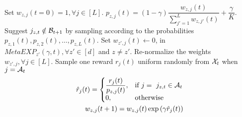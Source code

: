 \begin{algorithm}[!th]
\caption{$MetaEXP_{z}(\gamma, t)$}
\label{alg:mEXP3}
\begin{algorithmic}[1]
 Set $w_{z,j}(t=0) = 1, \forall j\in [L]$.
{}
\State $p_{z,j}(t) = \left( 1 - \gamma \right)\dfrac{w_{z,j}(t)}{\sum_{j'=1}^{L}w_{z,j'}(t)} + \dfrac{\gamma}{K}$.
\EndFor
\State Suggest $j_{z,t} \notin \mathcal{B}_{t+1}$ by sampling according to the probabilities $p_{z,1}(t), p_{z,2}(t), \ldots, p_{z,L}(t)$.
\State Set $w_{z',j}(t) \leftarrow 0$, in $MetaEXP_{z'}(\gamma, t),  \forall z' \in[d]$ and $z\neq z'$. Re-normalize the weights $w_{z',j},\forall j\in [L]$.
{}
\State Sample one reward $r_j(t)$ uniform randomly from $\mathcal{X}_t$ when $j = \mathcal{A}_t$
\State \begin{align*}
  \hat{r}_j(t)=\left\{
  \begin{array}{@{}ll@{}}
   \dfrac{r_{j}(t)}{p_{z,j}(t)}, & \text{if  } j = \ j_{z,t}  \in \A_t \\
    0, & \text{otherwise}
  \end{array}\right.\\
 w_{z,j}(t+1) = w_{z,j}(t)\exp\left( \gamma \hat{r}_j(t)\right)
\end{align*} 
\EndFor
\end{algorithmic}
\end{algorithm}


